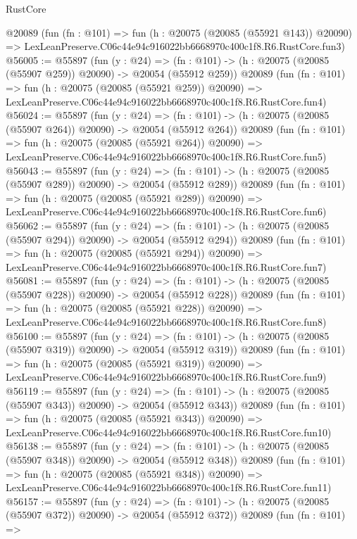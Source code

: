 \begin{lexlean}{RustCore}
\begin{coremodule}
    @20089
    (fun (fn : @101) =>
    fun (h : @20075 (@20085 (@55921 @143)) @20090) =>
    LexLeanPreserve.C06c44e94c916022bb6668970c400c1f8.R6.RustCore.fun3)
@56005 := @55897
    (fun (y : @24) =>
    (fn : @101) -> (h : @20075 (@20085 (@55907 @259)) @20090) -> @20054 (@55912 @259))
    @20089
    (fun (fn : @101) =>
    fun (h : @20075 (@20085 (@55921 @259)) @20090) =>
    LexLeanPreserve.C06c44e94c916022bb6668970c400c1f8.R6.RustCore.fun4)
@56024 := @55897
    (fun (y : @24) =>
    (fn : @101) -> (h : @20075 (@20085 (@55907 @264)) @20090) -> @20054 (@55912 @264))
    @20089
    (fun (fn : @101) =>
    fun (h : @20075 (@20085 (@55921 @264)) @20090) =>
    LexLeanPreserve.C06c44e94c916022bb6668970c400c1f8.R6.RustCore.fun5)
@56043 := @55897
    (fun (y : @24) =>
    (fn : @101) -> (h : @20075 (@20085 (@55907 @289)) @20090) -> @20054 (@55912 @289))
    @20089
    (fun (fn : @101) =>
    fun (h : @20075 (@20085 (@55921 @289)) @20090) =>
    LexLeanPreserve.C06c44e94c916022bb6668970c400c1f8.R6.RustCore.fun6)
@56062 := @55897
    (fun (y : @24) =>
    (fn : @101) -> (h : @20075 (@20085 (@55907 @294)) @20090) -> @20054 (@55912 @294))
    @20089
    (fun (fn : @101) =>
    fun (h : @20075 (@20085 (@55921 @294)) @20090) =>
    LexLeanPreserve.C06c44e94c916022bb6668970c400c1f8.R6.RustCore.fun7)
@56081 := @55897
    (fun (y : @24) =>
    (fn : @101) -> (h : @20075 (@20085 (@55907 @228)) @20090) -> @20054 (@55912 @228))
    @20089
    (fun (fn : @101) =>
    fun (h : @20075 (@20085 (@55921 @228)) @20090) =>
    LexLeanPreserve.C06c44e94c916022bb6668970c400c1f8.R6.RustCore.fun8)
@56100 := @55897
    (fun (y : @24) =>
    (fn : @101) -> (h : @20075 (@20085 (@55907 @319)) @20090) -> @20054 (@55912 @319))
    @20089
    (fun (fn : @101) =>
    fun (h : @20075 (@20085 (@55921 @319)) @20090) =>
    LexLeanPreserve.C06c44e94c916022bb6668970c400c1f8.R6.RustCore.fun9)
@56119 := @55897
    (fun (y : @24) =>
    (fn : @101) -> (h : @20075 (@20085 (@55907 @343)) @20090) -> @20054 (@55912 @343))
    @20089
    (fun (fn : @101) =>
    fun (h : @20075 (@20085 (@55921 @343)) @20090) =>
    LexLeanPreserve.C06c44e94c916022bb6668970c400c1f8.R6.RustCore.fun10)
@56138 := @55897
    (fun (y : @24) =>
    (fn : @101) -> (h : @20075 (@20085 (@55907 @348)) @20090) -> @20054 (@55912 @348))
    @20089
    (fun (fn : @101) =>
    fun (h : @20075 (@20085 (@55921 @348)) @20090) =>
    LexLeanPreserve.C06c44e94c916022bb6668970c400c1f8.R6.RustCore.fun11)
@56157 := @55897
    (fun (y : @24) =>
    (fn : @101) -> (h : @20075 (@20085 (@55907 @372)) @20090) -> @20054 (@55912 @372))
    @20089
    (fun (fn : @101) =>

\end{coremodule}
\end{lexlean}
